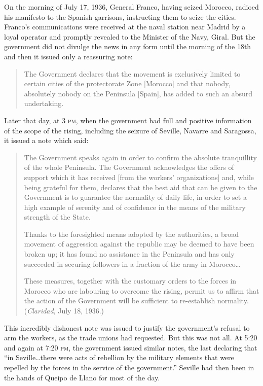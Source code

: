 On the morning of July 17, 1936, General Franco{\indexFFranco}, having seized Morocco{}, radioed his manifesto to the Spanish garrisons, instructing them to seize the cities. Franco’s communications were received at the naval station near Madrid by a loyal operator and promptly revealed to the Minister of the Navy, Giral. But the government did not divulge the news in any form until the morning of the 18th and then it issued only a reassuring note:
\nowidow

\begin{quotation}
  The Government declares that the movement is exclusively limited to certain cities of the protectorate Zone [Morocco] and that nobody, absolutely nobody on the Peninsula [Spain], has added to such an absurd undertaking.
\end{quotation}

Later that day, at 3 \textsc{pm}, when the government had full and positive information of the scope of the rising, including the seizure of Seville, Navarre and Saragossa, it issued a note which said:

\begin{quotation}
  \begin{sloppypar}
  The Government speaks again in order to confirm the absolute tranquillity of the whole Peninsula. The Government acknowledges the offers of support which it has received [from the workers’ organizations] and, while being grateful for them, declares that the best aid that can be given to the Government is to guarantee the normality of daily life, in order to set a high example of serenity and of confidence in the means of the military strength of the State.
  \end{sloppypar}
  
  Thanks to the foresighted means adopted by the authorities, a broad movement of aggression against the republic may be deemed to have been broken up; it has found no assistance in the Peninsula and has only succeeded in securing followers in a fraction of the army in Morocco\ldots
  
  These measures, together with the customary orders to the forces in Morocco who are labouring to overcome the rising, permit us to affirm that the action of the Government will be sufficient to re-establish normality. (\emph{Claridad}{\indexClaridad}, July 18, 1936.)
\end{quotation}

This incredibly dishonest note was issued to justify the government’s refusal to arm the workers, as the trade unions had requested. But this was not all. At 5:20 and again at 7:20 \textsc{pm}, the government issued similar notes, the last declaring that ``in Seville\ldots there were acts of rebellion by the military elements that were repelled by the forces in the service of the government.'' Seville had then been in the hands of Queipo de Llano for most of the day.

